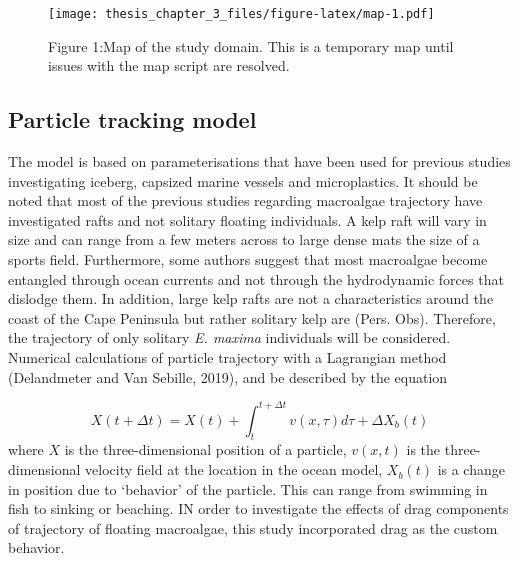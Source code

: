 \documentclass[
]{article}
\begin{document}
\begin{figure}
\centering
\texttt{[image: thesis\_chapter\_3\_files/figure-latex/map-1.pdf]}
\caption{Figure 1:Map of the study domain. This is a temporary map until
issues with the map script are resolved.}
\end{figure}

\hypertarget{particle-tracking-model}{%
\subsection{Particle tracking model}\label{particle-tracking-model}}

The model is based on parameterisations that have been used for previous
studies investigating iceberg, capsized marine vessels and
microplastics. It should be noted that most of the previous studies
regarding macroalgae trajectory have investigated rafts and not solitary
floating individuals. A kelp raft will vary in size and can range from a
few meters across to large dense mats the size of a sports field.
Furthermore, some authors suggest that most macroalgae become entangled
through ocean currents and not through the hydrodynamic forces that
dislodge them. In addition, large kelp rafts are not a characteristics
around the coast of the Cape Peninsula but rather solitary kelp are
(Pers. Obs). Therefore, the trajectory of only solitary \emph{E. maxima}
individuals will be considered. Numerical calculations of particle
trajectory with a Lagrangian method (Delandmeter and Van Sebille, 2019),
and be described by the equation

\[X(t+\Delta t) = X(t) + \int_{t}^{t+\Delta t} v(x, \tau)d \tau + \Delta X_b(t)\]
where \(X\) is the three-dimensional position of a particle, \(v(x,t)\)
is the three-dimensional velocity field at the location in the ocean
model, \(X_b(t)\) is a change in position due to `behavior' of the
particle. This can range from swimming in fish to sinking or beaching.
IN order to investigate the effects of drag components of trajectory of
floating macroalgae, this study incorporated drag as the custom
behavior.
\end{document}
